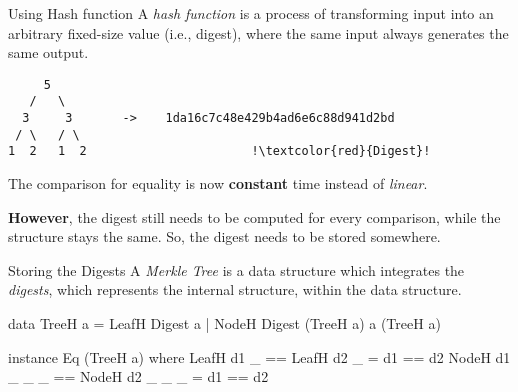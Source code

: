 \begin{slide}{Using Hash function}
A \textit{hash function} is a process of transforming input into an arbitrary fixed-size value (i.e., digest), where the same input always generates the same output.

\begin{center}
\begin{verbatim}
     5 
   /   \
  3     3       ->    1da16c7c48e429b4ad6e6c88d941d2bd
 / \   / \    
1  2   1  2                       !\textcolor{red}{Digest}!  
\end{verbatim}
\end{center}

\vspace*{0.4cm}
The comparison for equality is now \textbf{constant} time instead of \textit{linear}.

\textbf{However}, the digest still needs to be computed for every comparison, while the structure stays the same. So, the digest needs to be stored somewhere. 
\end{slide}



\begin{slide}{Storing the Digests}
A \textit{Merkle Tree} is a data structure which integrates the \textit{digests}, which represents the internal structure, within the data structure.

\vspace*{0.4cm}
\begin{haskell}
data TreeH a = LeafH Digest a
             | NodeH Digest (TreeH a) a (TreeH a)


instance Eq (TreeH a) where
  LeafH d1 _     == LeafH d2 _     = d1 == d2
  NodeH d1 _ _ _ == NodeH d2 _ _ _ = d1 == d2
\end{haskell}
\end{slide}

